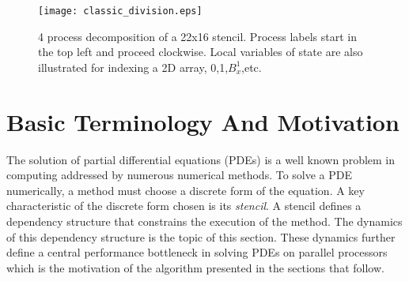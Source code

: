 
\newcommand{\nxl}{\textup{\textsf{nxl}}} %
\newcommand{\nyl}{\textup{\textsf{nyl}}} %
\newcommand{\tm}{ \text{$t_{max}$} }
\newcommand{\av}{ \mathbf{a} }
\newcommand{\uv}{ \mathbf{u} }
\newcommand{\bv}{ \mathbf{b} }
\newcommand{\pv}{ \mathbf{p} }
\newcommand{\orig} {\mathcal{O}}

\newcommand{\rnt}{ R_{-\theta} }
\newcommand{\rt}{ R_{\theta} }

\newcommand{\la}{\leftarrow} %
\newcommand{\ra}{\rightarrow} %

\newcommand{\dx}{\textsf{dx}}
\newcommand{\dy}{\textsf{dy}}

\newcommand{\data}{\textup{\textsf{data}}}
\newcommand{\psendf}{\textit{postSend}}
\newcommand{\precvf}{\textit{postRecv}}
\newcommand{\psend}[2]{\psendf(#1,#2)}
\newcommand{\precv}[2]{\precvf(#1,#2)}
\newcommand{\pid}{\textup{\textsf{pid}}} %


\begin{figure}[t]
  \centering
  \texttt{[image: classic\_division.eps]}
  \caption{4 process decomposition of a 22x16 stencil.  Process labels start in the top left and proceed clockwise.  Local
  variables of state are also illustrated for indexing a 2D array, 0,1,$B_x^1$,etc.}
  \label{fig:basic}
\end{figure}

\section{Basic Terminology And Motivation}\label{sec:problem_statement}
The solution of partial differential equations (PDEs)
is a well known problem in computing addressed by numerous
numerical methods.
To solve a PDE numerically, a method must choose a discrete
form of the equation.
A key characteristic of the discrete form chosen is its
 {\it stencil}.
A stencil
 defines a dependency structure that constrains
the execution of the method.  The dynamics
of this dependency structure is the topic of this section.
These dynamics further define a central performance bottleneck in
solving PDEs on parallel processors which is the motivation of
 the algorithm
presented in the sections that follow.

